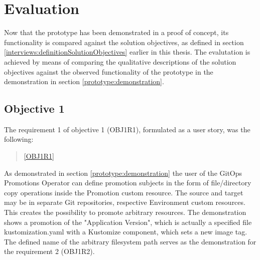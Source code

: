 





















\section{Evaluation}
\label{prototype:evaluation}

Now that the prototype has been demonstrated in a proof of concept,
its functionality is compared against the solution objectives,
as defined in section
\ref{interviews:definitionSolutionObjectives}
earlier in this thesis.
The evalutation is achieved by means of
comparing the qualitative descriptions of the solution objectives against the
observed functionality of the prototype in the demonstration in section \ref{prototype:demonstration}.

\subsection*{Objective 1}

The requirement 1 of objective 1 (OBJ1R1), formulated as a user story,
was the following:

\begin{quotation}
	\noindent
	\ref{OBJ1R1}
\end{quotation}

As demonstrated in section
\ref{prototype:demonstration}
the user of the GitOps Promotions Operator can define promotion subjects
in the form of file/directory copy operations inside the Promotion custom resource.
The source and target may be in separate Git repositories, respective Environment custom resources.
This creates the possibility to promote arbitrary resources.
The demonstration shows a promotion of the "Application Version",
which is actually a specified file kustomization.yaml with a Kustomize component,
which sets a new image tag.
The defined name of the arbitrary filesystem path serves as the demonstration for the requirement 2 (OBJ1R2).

